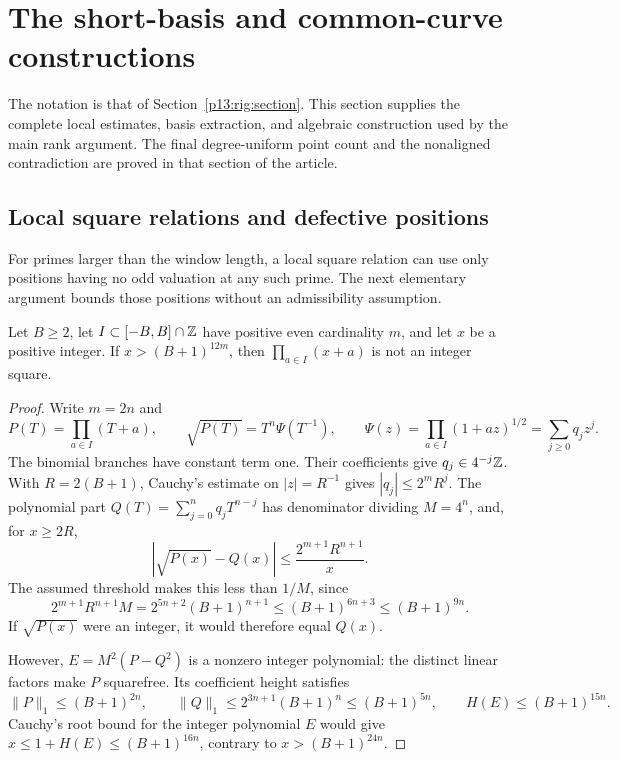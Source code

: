 \section{The short-basis and common-curve constructions}
\label{p14:comp:rigidity}

The notation is that of Section~\ref{p13:rig:section}.  This section
supplies the complete local estimates, basis extraction, and algebraic
construction used by the main rank argument.  The final
degree-uniform point count and the nonaligned contradiction are proved
in that section of the article.

\subsection{Local square relations and defective positions}

For primes larger than the window length, a local square relation
can use only positions having no odd valuation at any such prime.
The next elementary argument bounds those positions without an
admissibility assumption.

\begin{lemma}
\label{p13:rig:local-square}
Let $B\ge2$, let $I\subset[-B,B]\cap\mathbb Z$ have positive even
cardinality $m$, and let $x$ be a positive integer.  If
$x>(B+1)^{12m}$, then $\prod_{a\in I}(x+a)$ is not an integer
square.
\end{lemma}

\begin{proof}
Write $m=2n$ and
\[
 P(T)=\prod_{a\in I}(T+a),\qquad
 \sqrt{P(T)}=T^n\Psi(T^{-1}),\qquad
 \Psi(z)=\prod_{a\in I}(1+az)^{1/2}
                  =\sum_{j\ge0}q_jz^j.
\]
The binomial branches have constant term one.  Their coefficients
give $q_j\in4^{-j}\mathbb Z$.  With $R=2(B+1)$, Cauchy's estimate on
$|z|=R^{-1}$ gives $|q_j|\le2^mR^j$.  The polynomial part
$Q(T)=\sum_{j=0}^nq_jT^{n-j}$ has denominator dividing $M=4^n$,
and, for $x\ge2R$,
\[
 |\sqrt{P(x)}-Q(x)|\le\frac{2^{m+1}R^{n+1}}x.
\]
The assumed threshold makes this less than $1/M$, since
\[
 2^{m+1}R^{n+1}M
 =2^{5n+2}(B+1)^{n+1}
 \le(B+1)^{6n+3}\le(B+1)^{9n}.
\]
If $\sqrt{P(x)}$ were an integer, it would therefore equal $Q(x)$.

However, $E=M^2(P-Q^2)$ is a nonzero integer polynomial: the
distinct linear factors make $P$ squarefree.  Its coefficient
height satisfies
\[
 \|P\|_1\le(B+1)^{2n},\qquad
 \|Q\|_1\le2^{3n+1}(B+1)^n\le(B+1)^{5n},
 \qquad H(E)\le(B+1)^{15n}.
\]
Cauchy's root bound for the integer polynomial $E$ would give
$x\le1+H(E)\le(B+1)^{16n}$, contrary to
$x>(B+1)^{24n}$.
\end{proof}

